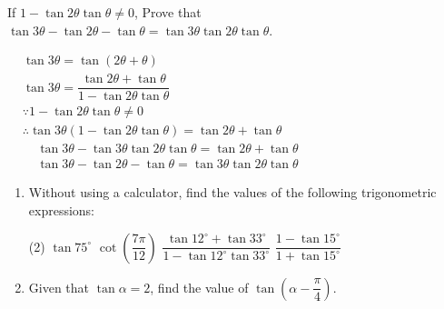 \documentclass{report}
\begin{document}
\begin{question}
	If $1-\tan 2 \theta \tan \theta \neq 0$, Prove that $\tan 3 \theta-\tan 2 \theta-\tan \theta=\tan 3 \theta \tan 2 \theta \tan \theta$.
	
	\proof{}
	
	\noindent $\begin{aligned} & \tan 3 \theta=\tan (2 \theta+\theta) \\ & \tan 3 \theta=\dfrac{\tan 2 \theta+\tan \theta}{1-\tan 2 \theta \tan \theta} \\ & \because 1-\tan 2 \theta \tan \theta \neq 0 \\ & \therefore \tan 3 \theta(1-\tan 2 \theta \tan \theta) =\tan 2 \theta+\tan \theta \\ &\ \ \ \ 
	\ \tan 3 \theta-\tan 3 \theta \tan 2 \theta \tan \theta=\tan 2 \theta+\tan \theta \\ &\ \ \ \ \ \tan 3 \theta-\tan 2 \theta-\tan \theta =\tan 3 \theta \tan 2 \theta \tan \theta\end{aligned}$
\end{question}

\begin{enumerate}
	\item Without using a calculator, find the values of the following trigonometric expressions:
	      \begin{tasks}[label=(\alph*)](2)
	      	\task $\tan 75^{\circ}$
	      	\task $\cot \left(\dfrac{7 \pi}{12}\right)$
	      	\task $\dfrac{\tan 12^{\circ}+\tan 33^{\circ}}{1-\tan 12^{\circ} \tan 33^{\circ}}$
	      	\task $\dfrac{1-\tan 15^{\circ}}{1+\tan 15^{\circ}}$
	      \end{tasks}
	\item Given that $\tan\alpha = 2$, find the value of $\tan\left(\alpha-\dfrac{\pi}{4}\right)$.
\end{enumerate}
\end{document}
